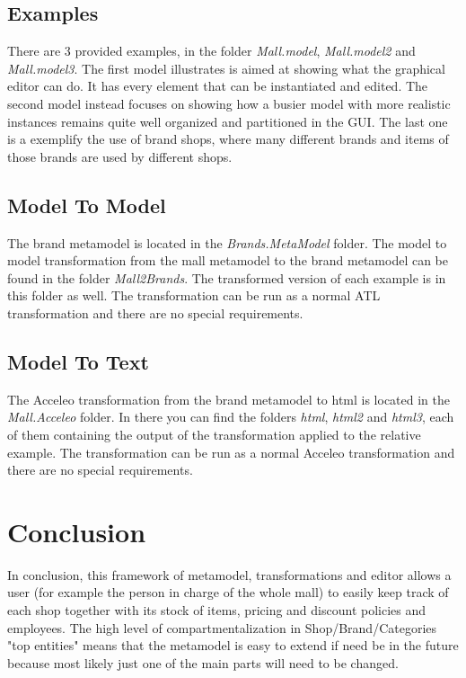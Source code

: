 \documentclass[a4paper]{article}
\begin{document}
\subsection{Examples}
There are 3 provided examples, in the folder \textit{Mall.model}, \textit{Mall.model2} and \textit{Mall.model3}.
The first model illustrates is aimed at showing what the graphical editor can do. It has every element that can be instantiated and edited.
The second model instead focuses on showing how a busier model with more realistic instances remains quite well organized and partitioned in the GUI.
The last one is a exemplify the use of brand shops, where many different brands and items of those brands are used by different shops.

\subsection{Model To Model}
The brand metamodel is located in the \textit{Brands.MetaModel} folder.
The model to model transformation from the mall metamodel to the brand metamodel can be found in the folder \textit{Mall2Brands}.  The transformed version of each example is in this folder as well. 
The transformation can be run as a normal ATL transformation and there are no special requirements. 

\subsection{Model To Text}
The Acceleo transformation from the brand metamodel to html is located in the \textit{Mall.Acceleo} folder. In there you can find the folders \textit{html}, \textit{html2} and \textit{html3}, each of them containing the output of the transformation applied to the relative example.
The transformation can be run as a normal Acceleo transformation and there are no special requirements.
	
\section{Conclusion}
In conclusion, this framework of metamodel, transformations and editor allows a user (for example the person in charge of the whole mall) to easily keep track of each shop together with its stock of items, pricing and discount policies and employees. The high level of compartmentalization in Shop/Brand/Categories "top entities" means that the metamodel is easy to extend if need be in the future because most likely just one of the main parts will need to be changed.
\end{document}
